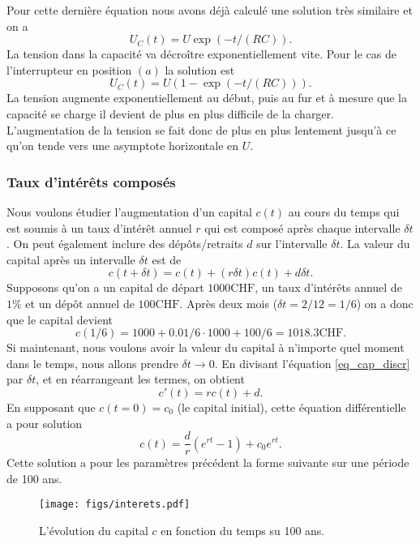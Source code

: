 \documentclass[a4paper,12pt]{book}
\renewcommand{\eqref}[1]{\ref{#1}}
\begin{document}
Pour cette dernière équation nous avons déjà calculé une solution très similaire et on a
\begin{equation}
 U_C(t)=U\exp(-t/(RC)).
\end{equation}
La tension dans la capacité va décroître exponentiellement vite.
Pour le cas de l'interrupteur en position $(a)$ la solution est 
\begin{equation}
 U_C(t)=U(1-\exp(-t/(RC))).
\end{equation}
La tension augmente exponentiellement au début, puis au fur et à mesure que la capacité se charge il devient de plus en plus difficile 
de la charger. L'augmentation de la tension se fait donc de plus en plus lentement jusqu'à ce qu'on tende vers une asymptote horizontale
en $U$.

\subsubsection{Taux d'intérêts composés}

Nous voulons étudier l'augmentation d'un capital $c(t)$ au cours du temps qui est soumis à un 
taux d'intérêt annuel $r$ qui est composé après chaque intervalle $\delta t$. On
peut également inclure des dépôts/retraits $d$ sur l'intervalle $\delta t$.
La valeur du capital après un intervalle $\delta t$ est de
\begin{equation}
 c(t+\delta t)=c(t)+(r\delta t )c(t)+d\delta t.\label{eq_cap_discr}
\end{equation}
Supposons qu'on a un capital de départ $1000 \mathrm{CHF}$, un taux d'intérêts annuel de 
$1\%$ et un dépôt annuel de $100\mathrm{CHF}$. Après deux mois ($\delta t=2/12=1/6$)
on a donc que le capital devient
\begin{equation}
 c(1/6)=1000+0.01/6\cdot 1000 +100/6=1018.3\mathrm{CHF}.
\end{equation}
Si maintenant, nous voulons avoir la valeur du capital à n'importe quel moment dans le
temps, nous allons prendre $\delta t\rightarrow 0$. En divisant l'équation
\eqref{eq_cap_discr} par $\delta t$, et en réarrangeant les termes, on obtient
\begin{equation}
 c'(t)=rc(t)+d.
\end{equation}
En supposant que $c(t=0)=c_0$ (le capital initial), cette équation différentielle a pour solution
\begin{equation}
 c(t)=\frac{d}{r}(e^{rt}-1)+c_0e^{r t}.
\end{equation}
Cette solution a pour les paramètres précédent la forme suivante sur une période de 100 ans.
\begin{figure}[htp]
\begin{center}
\texttt{[image: figs/interets.pdf]}
\end{center}
\caption{L'évolution du capital $c$ en fonction du temps su 100 ans.}\label{fig_interets}
\end{figure}
\end{document}
